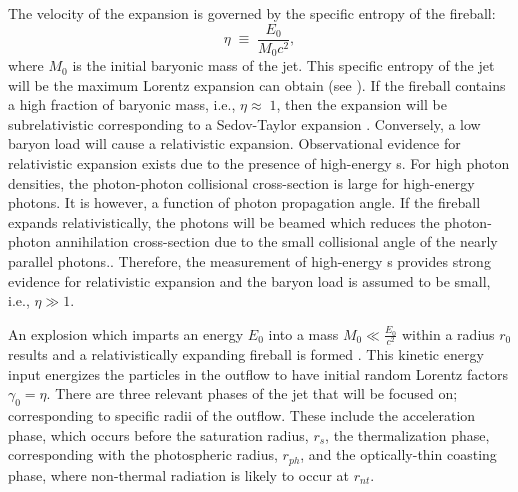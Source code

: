 The velocity of the expansion is governed by the specific entropy of
the fireball:
\begin{equation}
  \eta\;\equiv\;\frac{E_0}{M_0 c^2},
\end{equation}
where $M_0$ is the initial baryonic mass of the jet. This specific
entropy of the jet will be the maximum Lorentz expansion can obtain
(see ). If the fireball contains a high fraction
of baryonic mass, i.e., $\eta\approx\;1$, then the expansion will be
subrelativistic corresponding to a Sedov-Taylor expansion
\cite{Sedov:1946,Taylor:1950}. Conversely, a low baryon load will
cause a relativistic expansion. Observational evidence for
relativistic expansion exists due to the presence of high-energy
{\gray}s. For high photon densities, the photon-photon collisional
cross-section is large for high-energy photons. It is however, a
function of photon propagation angle. If the fireball expands
relativistically, the photons will be beamed which reduces the
photon-photon annihilation cross-section due to the small collisional
angle of the nearly parallel photons.. Therefore, the measurement of
high-energy {\gray}s provides strong evidence for relativistic
expansion and the baryon load is assumed to be small, i.e., $\eta\gg
1$.

An explosion which imparts an energy $E_0$ into a mass
$M_0\ll\frac{E_0}{c^2}$ within a radius $r_0$ results and a
relativistically expanding fireball is formed
\cite{Blandford:1976}. This kinetic energy input energizes the
particles in the outflow to have initial random Lorentz factors
$\gamma_0=\eta$. There are three relevant phases of the jet that will
be focused on; corresponding to specific radii of the outflow. These
include the acceleration phase, which occurs before the saturation
radius, $r_s$, the thermalization phase, corresponding with the
photospheric radius, $r_{ph}$, and the optically-thin coasting phase,
where non-thermal radiation is likely to occur at $r_{nt}$.

